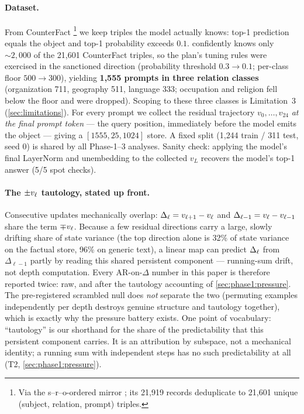 \paragraph{Dataset.}
From CounterFact \citep{meng2022rome}\footnote{Via the s--r--o-ordered mirror
; its 21{,}919 records deduplicate to
21{,}601 unique (subject, relation, prompt) triples.} we keep triples the model actually
knows: top-1 prediction equals the object and top-1 probability exceeds
$0.1$. \pythia{} confidently knows only ${\sim}2{,}000$ of the 21{,}601
CounterFact triples, so the plan's tuning rules were exercised in the sanctioned
direction (probability threshold $0.3 \to 0.1$; per-class floor $500 \to
300$), yielding \textbf{1{,}555 prompts in three relation classes}
(organization 711, geography 511, language 333; occupation and religion fell
below the floor and were dropped). Scoping to these three classes is
Limitation~3 (\cref{sec:limitations}). For every prompt we collect the
residual trajectory $v_0,\dots,v_{24}$ \emph{at the final prompt token} ---
the query position, immediately before the model emits the object --- giving a
$[1555, 25, 1024]$ store. A fixed split (1{,}244 train / 311 test, seed 0) is
shared by all Phase-1--3 analyses. Sanity check: applying the model's final
LayerNorm and unembedding to the collected $v_L$ recovers the model's top-1
answer (5/5 spot checks).

\paragraph{The $\pm v_\ell$ tautology, stated up front.}
\label{sec:phase1:tautology}
Consecutive updates mechanically overlap: $\Delta_\ell = v_{\ell+1} - v_\ell$ and
$\Delta_{\ell-1} = v_\ell - v_{\ell-1}$ share the term $\mp v_\ell$. Because a few
residual directions carry a large, slowly drifting share of state variance
(the top direction alone is 32\% of state variance on the factual store, 96\%
on generic text), a linear map can predict $\Delta_\ell$ from $\Delta_{\ell-1}$ partly
by reading this shared persistent component --- running-sum drift, not depth
computation. Every AR-on-$\Delta$ number in this paper is therefore reported
twice: raw, and after the tautology accounting of
\cref{sec:phase1:pressure}. The pre-registered scrambled null does \emph{not}
separate the two (permuting examples independently per depth destroys genuine
structure and tautology together), which is exactly why the pressure battery
exists. One point of vocabulary: ``tautology'' is our shorthand for the share
of the predictability that this persistent component carries. It is an
attribution by subspace, not a mechanical identity; a running sum with
independent steps has no such predictability at all (T2,
\cref{sec:phase1:pressure}).

